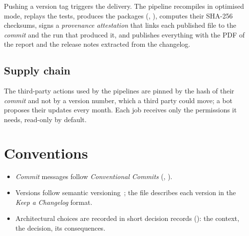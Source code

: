 Pushing a version tag  triggers the delivery. The pipeline recompiles in
optimised mode, replays the tests, produces the packages (, ),
computes their SHA-256 checksums, signs a \emph{provenance attestation} that links each
published file to the \emph{commit} and the run that produced it, and publishes everything
with the PDF of the report and the release notes extracted from the changelog.

\subsection{Supply chain}

The third-party actions used by the pipelines are pinned by the hash of their \emph{commit}
and not by a version number, which a third party could move; a bot proposes their updates
every month. Each job receives only the permissions it needs, read-only by default.

\section{Conventions}

\begin{itemize}
    \item \emph{Commit} messages follow \emph{Conventional Commits} (,
          ).
    \item Versions follow semantic versioning~\cite{semver}; the file 
          describes each version in the \emph{Keep a Changelog} format.
    \item Architectural choices are recorded in short decision records
          (): the context, the decision, its consequences.
\end{itemize}
